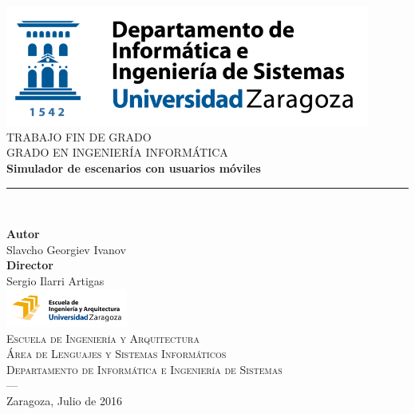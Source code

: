 \begin{titlepage}
 
 
\newlength{\centeroffset}
\setlength{\centeroffset}{-0.5\oddsidemargin}
\addtolength{\centeroffset}{0.5\evensidemargin}
\thispagestyle{empty}

\noindent\hspace*{\centeroffset}\begin{minipage}{\textwidth}

\centering
\includegraphics[width=0.9\textwidth]{imagenes/diislogoblanco_0.png}\\[1.4cm]

\textsc{ \Large TRABAJO FIN DE GRADO\\[0.2cm]}
\textsc{ GRADO EN INGENIERÍA INFORMÁTICA}\\[1cm]
% 
{\Huge\bfseries Simulador de escenarios con usuarios móviles\\
}
\noindent\rule[-1ex]{\textwidth}{3pt}\\[3.5ex]
\end{minipage}

\vspace{2.5cm}
\noindent\hspace*{\centeroffset}\begin{minipage}{\textwidth}
\centering

\textbf{Autor}\\ {Slavcho Georgiev Ivanov}\\[2.5ex]
\textbf{Director}\\
{Sergio Ilarri Artigas}\\[2cm]
\includegraphics[width=0.3\textwidth]{imagenes/logo-eina.png}\\[0.1cm]
\textsc{Escuela de Ingeniería y Arquitectura}\\
\textsc{Área de Lenguajes y Sistemas Informáticos}\\
\textsc{Departamento de Informática e Ingeniería de Sistemas}\\
\textsc{---}\\
Zaragoza, Julio de 2016
\end{minipage}
\end{titlepage}


